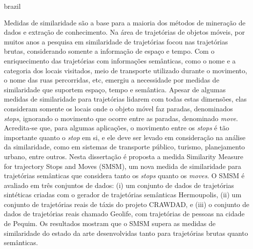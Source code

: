 \swapcontents
{
    \begin{otherlanguage*}{brazil}
    \begin{resumo}[Resumo]

        Medidas de similaridade são a base para a maioria dos métodos de mineração de dados e extração de conhecimento. Na área de trajetórias de objetos móveis, por muitos anos a pesquisa em similaridade de trajetórias focou nas trajetórias brutas, considerando somente a informação de espaço e tempo. Com o enriquecimento das trajetórias com informações semânticas, como o nome e a categoria dos locais visitados, meio de transporte utilizado durante o movimento, o nome das ruas percorridas, etc, emergiu a necessidade por medidas de similaridade que suportem espaço, tempo e semântica. Apesar de algumas medidas de similaridade para trajetórias lidarem com todas estas dimensões, elas consideram somente os locais onde o objeto móvel faz paradas, denominados \emph{stops}, ignorando o movimento que ocorre entre as paradas, denominado \emph{move}.
        Acredita-se que, para algumas aplicações, o movimento entre os \emph{stops} é tão importante quanto o \emph{stop} em si, e ele deve ser levado em consideração na análise da similaridade, como em sistemas de transporte público, turismo, planejamento urbano, entre outros.
        Nesta dissertação é proposta a medida Similarity Measure for trajectory Stops and Moves (SMSM), um nova medida de similaridade para trajetórias semânticas que considera tanto os \emph{stops} quanto os \emph{moves}.
        O SMSM é avaliado em três conjuntos de dados: (i) um conjunto de dados de trajetórias sintéticas criadas com o gerador de trajetórias semânticas Hermoupolis, (ii) um conjunto de trajetórias reais de táxis do projeto CRAWDAD, e (iii) o conjunto de dados de trajetórias reais chamado Geolife, com trajetórias de pessoas na cidade de Pequim. Os resultados mostram que o SMSM supera as medidas de similaridade do estado da arte desenvolvidas tanto para trajetórias brutas quanto semânticas.
        

    \end{resumo}
    \end{otherlanguage*}
}
